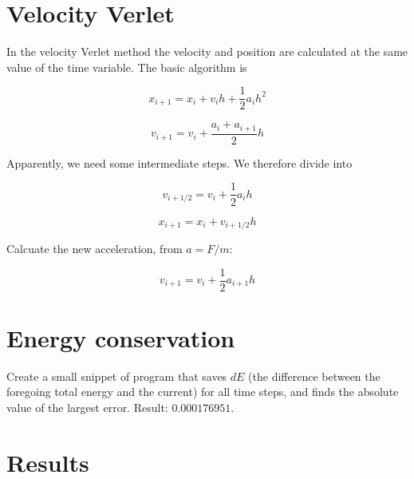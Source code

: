 \documentclass[11pt]{article}
\begin{document}
\section{Velocity Verlet}

\begin{flushleft}
In the velocity Verlet method the velocity and position are calculated at the same value of the time variable. The basic algorithm is

\begin{equation}
x_{i+1} = x_i + v_i h + \frac{1}{2} a_i h^2
\end{equation}

\begin{equation}
v_{i+1} = v_i + \frac{a_i + a_{i+1}}{2}h
\end{equation}

Apparently, we need some intermediate steps. We therefore divide into 

\begin{equation}
v_{i+1/2} = v_i + \frac{1}{2} a_i h
\end{equation}

\begin{equation}
x_{i+1} = x_i + v_{i+1/2} h
\end{equation}

Calcuate the new acceleration, from $a = F/m$:

\begin{equation}
v_{i+1} = v_i + \frac{1}{2} a_{i+1} h
\end{equation}

\section{Energy conservation}

\begin{flushleft}
Create a small snippet of program that saves $dE$ (the difference between the foregoing total energy and the current) for all time steps, and finds the absolute value of the largest error. Result: $0.000176951$.
\end{flushleft}

\section{Results}


\end{flushleft}
\end{document}
